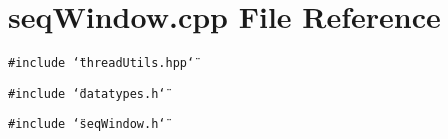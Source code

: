 \section{seq\-Window.cpp File Reference}
\label{seqWindow_8cpp}
{\tt \#include \char`\"{}thread\-Utils.hpp\char`\"{}}\par
{\tt \#include \char`\"{}datatypes.h\char`\"{}}\par
{\tt \#include \char`\"{}seq\-Window.h\char`\"{}}\par
